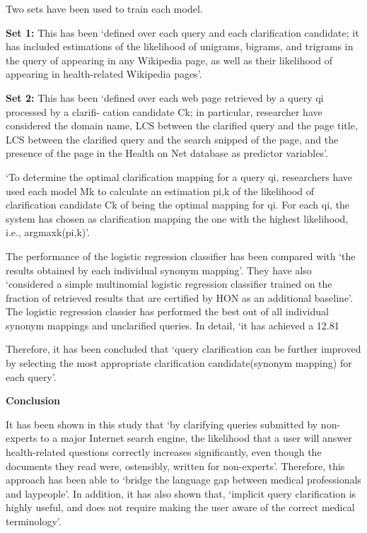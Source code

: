 \documentclass[]{article}
\begin{document}
Two sets have been used to train each model.

\textbf{Set 1:} This has been ‘defined over each query and each clarification candidate; it has included estimations of the likelihood of unigrams, bigrams, and trigrams in the query of appearing in any Wikipedia page, as well as their likelihood of appearing in health-related Wikipedia pages’.

\textbf{Set 2:} This has been ‘defined over each web page retrieved by a query qi processed by a clarifi- cation candidate Ck; in particular, researcher have considered the domain name, LCS between the clarified query and the page title, LCS between the clarified query and the search snipped of the page, and the presence of the page in the Health on Net database as predictor variables’. 

‘To determine the optimal clarification mapping for a query qi, researchers have used each model Mk to calculate an estimation pi,k of the likelihood of clarification candidate Ck of being the optimal mapping for qi. For each qi, the system has chosen as clarification mapping the one with the highest likelihood, i.e., argmaxk(pi,k)’. 

The performance of the logistic regression classifier has been compared with ‘the results obtained by each individual synonym mapping’. They have also ‘considered a simple multinomial logistic regression classifier trained on the fraction of retrieved results that are certified by HON as an additional baseline’. The logistic regression classier has performed the best out of all individual synonym mappings and unclarified queries. In detail, ‘it has achieved a 12.81 %

Therefore, it has been concluded that ‘query clarification can be further improved by selecting the most appropriate clarification candidate(synonym mapping) for each query’.  


\textbf{Conclusion}

It has been shown in this study that ‘by clarifying queries submitted by non-experts to a major Internet search engine, the likelihood that a user will answer health-related questions correctly increases significantly, even though the documents they read were, ostensibly, written for non-experts’. Therefore, this approach has been able to ‘bridge the language gap between medical professionals and laypeople’. In addition, it has also shown that, ‘implicit query clarification is highly useful, and does not require making the user aware of the correct medical terminology’.   

  
\end{document}
